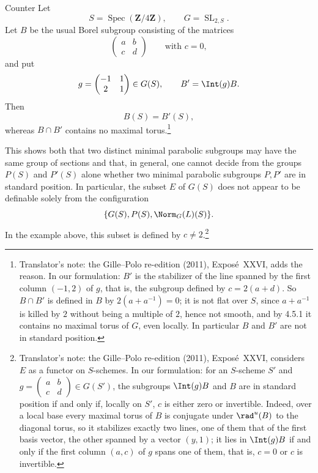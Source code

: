 \begin{sgastatement}{Counter}
Let
\[
 S=\operatorname{Spec}(\mathbf Z/4\mathbf Z),
 \qquad G=\operatorname{SL}_{2,S}.
\]
Let \(B\) be the usual Borel subgroup consisting of the matrices
\[
 \begin{pmatrix}a&b\\c&d\end{pmatrix}
 \qquad\text{with }c=0,
\]
and put
\[
 g=\begin{pmatrix}-1&1\\2&1\end{pmatrix}\in G(S),
 \qquad B'=\Int(g)B.
\]
Then
\[
 B(S)=B'(S),
\]
whereas \(B\cap B'\) contains no maximal torus.\footnote{Translator's note: the Gille--Polo re-edition (2011), Exposé~XXVI, adds
the reason. In our formulation: \(B'\) is the stabilizer of the line spanned
by the first column \((-1,2)\) of \(g\), that is, the subgroup defined by
\(c=2(a+d)\). So \(B\cap B'\) is defined in \(B\) by \(2(a+a^{-1})=0\); it is
not flat over \(S\), since \(a+a^{-1}\) is killed by \(2\) without being a
multiple of \(2\), hence not smooth, and by 4.5.1 it contains no maximal torus
of \(G\), even locally. In particular \(B\) and \(B'\) are not in standard
position.}

This shows both that two distinct minimal parabolic subgroups may
have the same group of sections and that, in general, one cannot
decide from the groups \(P(S)\) and \(P'(S)\) alone whether two
minimal parabolic subgroups \(P,P'\) are in standard position.  In
particular, the subset \(E\) of \(G(S)\) does not appear to be
definable solely from the configuration
\[
 \{G(S),P(S),\Norm_G(L)(S)\}.
\]
In the example above, this subset is defined by \(c\ne2\).\footnote{Translator's note: the Gille--Polo re-edition (2011), Exposé~XXVI,
considers \(E\) as a functor on \(S\)-schemes. In our formulation: for an
\(S\)-scheme \(S'\) and \(g=\left(\begin{smallmatrix}a&b\\c&d\end{smallmatrix}\right)\in G(S')\),
the subgroups \(\Int(g)B\) and \(B\) are in standard position if and only if,
locally on \(S'\), \(c\) is either zero or invertible. Indeed, over a local
base every maximal torus of \(B\) is conjugate under \(\rad^u(B)\) to the
diagonal torus, so it stabilizes exactly two lines, one of them that of the
first basis vector, the other spanned by a vector \((y,1)\); it lies in
\(\Int(g)B\) if and only if the first column \((a,c)\) of \(g\) spans one of
them, that is, \(c=0\) or \(c\) is invertible.}
\end{sgastatement}
